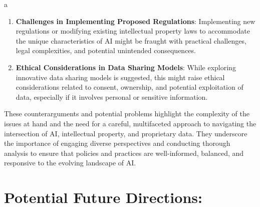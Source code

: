 a\documentclass{article}[10pt]
\begin{document}
\begin{enumerate}
    \item \textbf{Challenges in Implementing Proposed Regulations}: Implementing new regulations or modifying existing intellectual property laws to accommodate the unique characteristics of AI might be fraught with practical challenges, legal complexities, and potential unintended consequences.
    \item \textbf{Ethical Considerations in Data Sharing Models}: While exploring innovative data sharing models is suggested, this might raise ethical considerations related to consent, ownership, and potential exploitation of data, especially if it involves personal or sensitive information.
\end{enumerate}

These counterarguments and potential problems highlight the complexity of the issues at hand and the need for a careful, multifaceted approach to navigating the intersection of AI, intellectual property, and proprietary data. They underscore the importance of engaging diverse perspectives and conducting thorough analysis to ensure that policies and practices are well-informed, balanced, and responsive to the evolving landscape of AI.

\section{Potential Future Directions:}
\end{document}
